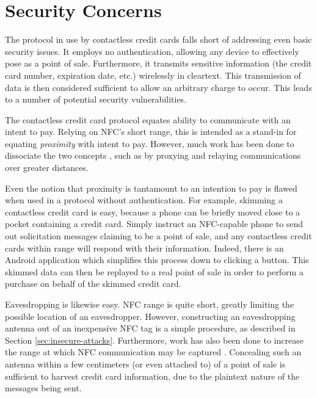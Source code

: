 \section{Security Concerns}
\label{sec:intro-security}

The protocol in use by contactless credit cards falls short of addressing even basic security issues.
It employs no authentication, allowing any device to effectively pose as a point of sale.
Furthermore, it transmits sensitive information (the credit card number, expiration date, etc.) wirelessly in cleartext.
This transmission of data is then considered sufficient to allow an arbitrary charge to occur.
This leads to a number of potential security vulnerabilities.

The contactless credit card protocol equates ability to communicate with an intent to pay.
Relying on NFC's short range, this is intended as a stand-in for equating \emph{proximity} with intent to pay.
However, much work has been done to dissociate the two concepts \cite{brown2013evaluating, Drimer:2007:KYE:1362903.1362910, francis2010practical, hancke2005practical, markantonakis2012practical}, such as by proxying and relaying communications over greater distances.

Even the notion that proximity is tantamount to an intention to pay is flawed when used in a protocol without authentication.
For example, skimming a contactless credit card is easy, because a phone can be briefly moved close to a pocket containing a credit card.
Simply instruct an NFC-capable phone to send out solicitation messages claiming to be a point of sale, and any contactless credit cards within range will respond with their information.
Indeed, there is an Android application \cite{NFCProxy} which simplifies this process down to clicking a button.
This skimmed data can then be replayed to a real point of sale in order to perform a purchase on behalf of the skimmed credit card.

Eavesdropping is likewise easy.
NFC range is quite short, greatly limiting the possible location of an eavesdropper.
However, constructing an eavesdropping antenna out of an inexpensive NFC tag is a simple procedure, as described in Section \ref{sec:insecure-attacks}.
Furthermore, work has also been done to increase the range at which NFC communication may be captured \cite{brown2013evaluating, kfir2005picking}.
Concealing such an antenna within a few centimeters (or even attached to) of a point of sale is sufficient to harvest credit card information,
    due to the plaintext nature of the messages being sent.

